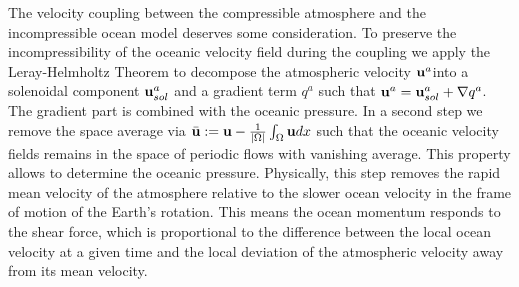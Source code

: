 \documentclass[11pt, oneside]{article}   	%
\numberwithin{equation}{section}
\theoremstyle{plain}
\theoremstyle{definition}
\theoremstyle{remark}
\newcommand{\<}{\langle}
\renewcommand{\>}{\rangle}
\def\U{{\bf u}}
\begin{document}
The velocity coupling between the compressible atmosphere and the incompressible ocean model deserves some consideration. To preserve the incompressibility of the oceanic velocity field during the coupling we apply the Leray-Helmholtz Theorem to decompose the atmospheric velocity $\U^a$into a solenoidal component $\U^a_{sol}$ and a gradient term $q^a$ such that $\U^a=\U^a_{sol}+\nabla q^a$. The gradient part is combined with the oceanic pressure. In a second step we remove the space average via 
$\bar{\U}:=\U-\frac{1}{|\Omega|}\int_\Omega \U dx$ such that the oceanic velocity fields remains in the space of periodic flows with vanishing average. This property allows to determine the oceanic pressure.
Physically, this step removes the rapid mean velocity of the atmosphere relative to the slower ocean velocity in the frame of motion of the Earth's rotation. This means the ocean momentum responds to the shear force, which is proportional to the difference between the local ocean velocity at a given time and the local deviation of the atmospheric velocity away from its mean velocity.   

\end{document}
